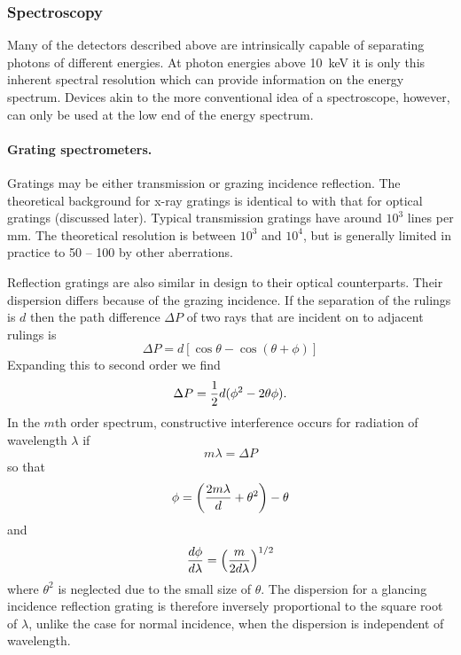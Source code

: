 \subsubsection{Spectroscopy}

Many of the detectors described above are intrinsically capable of separating 
photons of different energies. At photon energies above 10~keV it is only this
inherent spectral resolution which can provide information on the energy spectrum.
Devices akin to the more conventional idea of a spectroscope, however, can only 
be used at the low end of the energy spectrum.

\paragraph{Grating spectrometers.} Gratings may be either transmission or grazing
incidence reflection. The theoretical background for x-ray gratings is identical
to with that for optical gratings (discussed later). Typical transmission
gratings have around $10^3$ lines per mm. The theoretical resolution is
between $10^3$ and $10^4$, but is generally limited in practice to 50 -- 100 by
other aberrations.

Reflection gratings are also similar in design to their optical counterparts.
Their dispersion differs because of the grazing incidence. If the separation
of the rulings is $d$ then the path difference $\Delta P$ of two rays that
are incident on to adjacent rulings is
\[
\Delta P=d[\cos\theta-\cos(\theta+\phi)]
\]
Expanding this to second order we find
\[
\Delta P={1\over 2}d(\phi^2-2\theta\phi).
\]
In the $m$th order spectrum, constructive interference occurs for radiation
of wavelength $\lambda$ if 
\[
m\lambda=\Delta P
\]
so that
\[
\phi=\left({{2m\lambda\over d}+\theta^2}\right)-\theta
\]
and
\[
{d\phi\over d\lambda}=\left({m\over 2d\lambda}\right)^{1/2}
\]
where $\theta^2$ is neglected due to the small size of $\theta$. The
dispersion for a glancing incidence reflection grating is therefore inversely
proportional to the square root of $\lambda$, unlike the case for normal 
incidence, when the dispersion is independent of wavelength.

